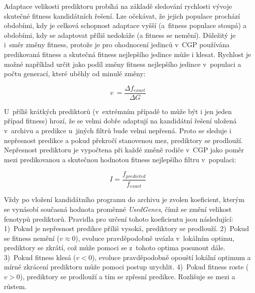 \documentclass[czech]{ExcelAtFIT} %
\begin{document}
Adaptace velikosti prediktoru probíhá na základě sledování rychlosti vývoje skutečné fitness kan\-di\-dát\-ních ře\-šení. Lze očekávat, že jejich populace prochází ob\-do\-bími, kdy je celková schopnost adaptace vyšší (a~fitness populace stoupá) a obdobími, kdy se adaptovat příliš nedokáže (a fitness se nemění). Důležitý je i~směr změny fitness, protože je pro ohodnocení je\-dinců v~CGP používána predikovaná fitness a skutečná fitness nejlepšího jedince může i klesat. Rychlost je možné například určit jako podíl změny fitness nej\-lep\-šího jedince v~populaci a počtu generací, které uběhly od minulé změny:

\begin{equation}
    \label{eq:velocity}
    v~= \frac{\Delta{}f_{\mathit{exact}}}{\Delta{}G}
\end{equation}

U~příliš krátkých prediktorů (v~extrémním případě to může být i jen jeden případ fitness) hrozí, že se velmi dobře adaptují na kandidátní řešení uložená v~archivu a predikce u~jiných filtrů bude velmi nepřesná. Proto se sleduje i nepřesnost predikce a pokud překročí stanovenou mez, prediktory se prodlouží. Nepřesnost prediktoru je vypočtena při každé změně rodiče v~CGP jako poměr mezi predikovanou a skutečnou hodnotou fitness nejlepšího filtru v~populaci:

\begin{equation}
    \mathit{I} = \frac{f_{\mathit{predicted}}}{f_{\mathit{exact}}}
\end{equation}

Vždy po vložení kandidátního programu do ar\-chivu je zvolen koeficient, kterým se vynásobí sou\-časná hodnota proměnné \emph{UsedGenes}, čímž se změní velikost fenotypů prediktorů. Pravidla pro určení tohoto koeficientu jsou následující: 1)~Pokud je nepřesnost pre\-dikce příliš vysoká, pre\-dik\-to\-ry se prodlouží. 2)~Pokud se fitness nemění ($v \approx 0$), evoluce prav\-dě\-po\-dob\-ně uvázla v~lokálním op\-ti\-mu, pre\-dik\-tory se zkrátí, což může pomoci se z~tohoto op\-ti\-ma po\-su\-nout dále. 3)~Pokud fitness klesá ($v < 0$), evoluce prav\-dě\-po\-dobně opouští lokální optimum a mírné zkrácení prediktoru může pomoci postup urychlit. 4)~Pokud fitness roste ($v > 0$), prediktory se prodlouží a tím se zpřesní predikce. Rozlišuje se mezi  a  růstem.


\end{document}
